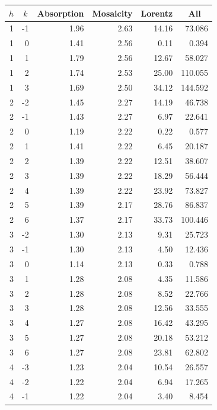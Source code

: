 \begin{table}[htbp]
  \centering
    \begin{tabular}{rrrrrr}
    \hline
    \multicolumn{1}{c}{$h$} & \multicolumn{1}{c}{$k$} & \multicolumn{1}{c}{Absorption} & \multicolumn{1}{c}{Mosaicity} & \multicolumn{1}{c}{Lorentz} & \multicolumn{1}{c}{All} \\
    \hline    
    1  & -1 & 1.96 & 2.63 & 14.16 & 73.086  \\
    1  & 0  & 1.41 & 2.56 & 0.11  & 0.394   \\
    1  & 1  & 1.79 & 2.56 & 12.67 & 58.027  \\
    1  & 2  & 1.74 & 2.53 & 25.00 & 110.055 \\
    1  & 3  & 1.69 & 2.50 & 34.12 & 144.592 \\
    2  & -2 & 1.45 & 2.27 & 14.19 & 46.738  \\
    2  & -1 & 1.43 & 2.27 & 6.97  & 22.641  \\
    2  & 0  & 1.19 & 2.22 & 0.22  & 0.577   \\
    2  & 1  & 1.41 & 2.22 & 6.45  & 20.187  \\
    2  & 2  & 1.39 & 2.22 & 12.51 & 38.607  \\
    2  & 3  & 1.39 & 2.22 & 18.29 & 56.444  \\
    2  & 4  & 1.39 & 2.22 & 23.92 & 73.827  \\
    2  & 5  & 1.39 & 2.17 & 28.76 & 86.837  \\
    2  & 6  & 1.37 & 2.17 & 33.73 & 100.446 \\
    3  & -2 & 1.30 & 2.13 & 9.31  & 25.723  \\
    3  & -1 & 1.30 & 2.13 & 4.50  & 12.436  \\
    3  & 0  & 1.14 & 2.13 & 0.33  & 0.788   \\
    3  & 1  & 1.28 & 2.08 & 4.35  & 11.586  \\
    3  & 2  & 1.28 & 2.08 & 8.52  & 22.766  \\
    3  & 3  & 1.28 & 2.08 & 12.56 & 33.555  \\
    3  & 4  & 1.27 & 2.08 & 16.42 & 43.295  \\
    3  & 5  & 1.27 & 2.08 & 20.18 & 53.212  \\
    3  & 6  & 1.27 & 2.08 & 23.81 & 62.802  \\
    4  & -3 & 1.23 & 2.04 & 10.54 & 26.557  \\
    4  & -2 & 1.22 & 2.04 & 6.94  & 17.265  \\
    4  & -1 & 1.22 & 2.04 & 3.40  & 8.454   \\

\end{tabular}
\end{table}
